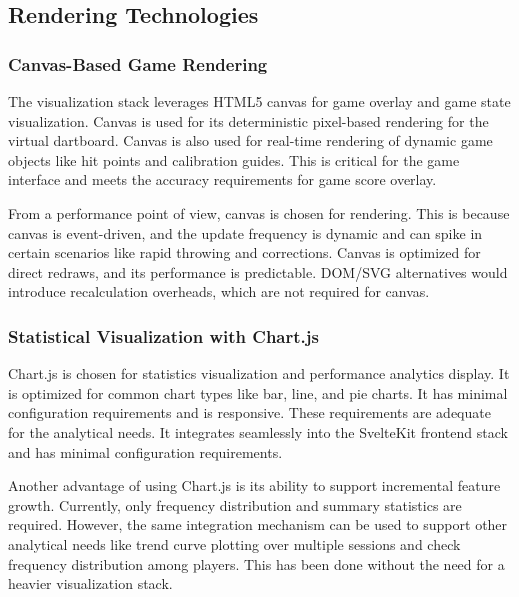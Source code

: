 \vspace{\baselineskip}

\subsection{Rendering Technologies}

\subsubsection{Canvas-Based Game Rendering}
The visualization stack leverages HTML5 canvas for game overlay and game state visualization. Canvas is used for its deterministic pixel-based rendering for the virtual dartboard. Canvas is also used for real-time rendering of dynamic game objects like hit points and calibration guides. This is critical for the game interface and meets the accuracy requirements for game score overlay.

From a performance point of view, canvas is chosen for rendering. This is because canvas is event-driven, and the update frequency is dynamic and can spike in certain scenarios like rapid throwing and corrections. Canvas is optimized for direct redraws, and its performance is predictable. DOM/SVG alternatives would introduce recalculation overheads, which are not required for canvas.

\subsubsection{Statistical Visualization with Chart.js}
Chart.js is chosen for statistics visualization and performance analytics display. It is optimized for common chart types like bar, line, and pie charts. It has minimal configuration requirements and is responsive. These requirements are adequate for the analytical needs. It integrates seamlessly into the SvelteKit frontend stack and has minimal configuration requirements.

Another advantage of using Chart.js is its ability to support incremental feature growth. Currently, only frequency distribution and summary statistics are required. However, the same integration mechanism can be used to support other analytical needs like trend curve plotting over multiple sessions and check frequency distribution among players. This has been done without the need for a heavier visualization stack.

